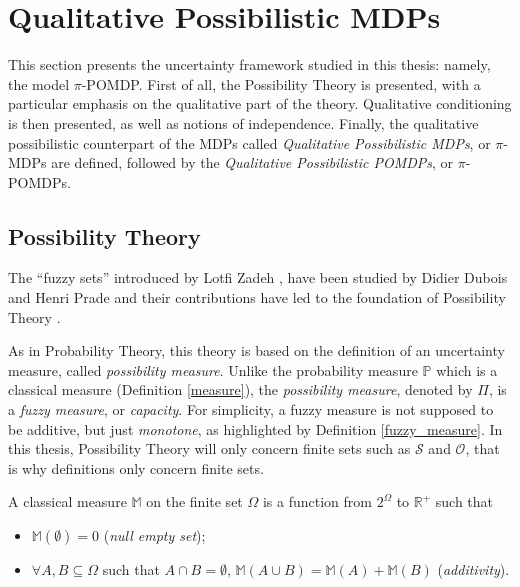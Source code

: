 \section{Qualitative Possibilistic MDPs}
This section presents the uncertainty framework studied in this thesis:
namely, the model $\pi$-POMDP.
First of all, the Possibility Theory is presented, 
with a particular emphasis on the qualitative part 
of the theory. Qualitative conditioning is then presented,
as well as notions of independence.
Finally, the qualitative possibilistic counterpart of the MDPs 
called \textit{Qualitative Possibilistic MDPs}, or $\pi$-MDPs
are defined, followed by the \textit{Qualitative Possibilistic POMDPs}, or $\pi$-POMDPs.
\subsection{Possibility Theory}
\label{posspres}
The ``fuzzy sets'' introduced by Lotfi Zadeh \cite{Zadeh1965338}, 
have been studied by Didier Dubois \cite{didiersgroundhogday} and Henri Prade
and their contributions have led to the foundation of Possibility Theory \cite{DuPr1988.4}.

As in Probability Theory, this theory is based on the definition of an uncertainty measure,
called \textit{possibility measure}.
Unlike the probability measure $\mathbb{P}$ 
which is a classical measure (Definition \ref{measure}),
the \textit{possibility measure}, denoted by $\Pi$, is a \textit{fuzzy measure}, or \textit{capacity}.
For simplicity, a fuzzy measure is not supposed to be additive,
but just \textit{monotone}, as highlighted by Definition \ref{fuzzy_measure}.
In this thesis, Possibility Theory will only concern 
finite sets such as $\mathcal{S}$ and $\mathcal{O}$,
that is why definitions only concern finite sets.
\begin{Def}[Measure]
\label{measure}
A classical measure $\mathbb{M}$ on the finite set $\Omega$ is a function from $2^{\Omega}$ to $\mathbb{R}^{+}$ such that
\begin{itemize}
\item $\mathbb{M}(\emptyset) = 0$ (\textit{null empty set});
\item $\forall A,B \subseteq \Omega$ such that $A \cap B = \emptyset$, $\mathbb{M}(A \cup B ) = \mathbb{M}(A) + \mathbb{M}( B ) $ (\textit{additivity}).
\end{itemize}
\end{Def}

